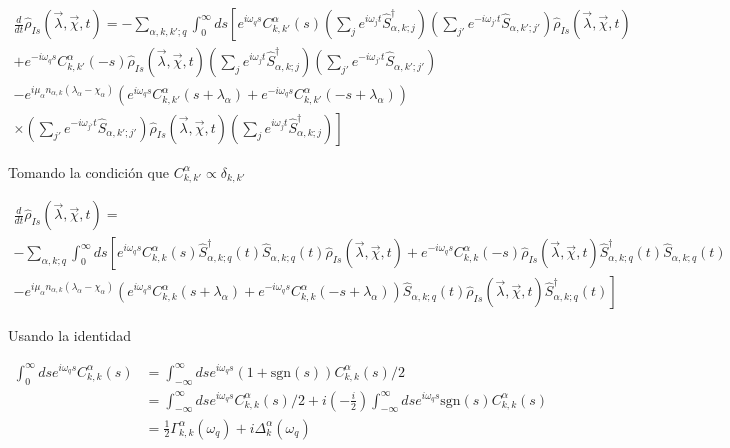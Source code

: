\begin{appendixs}
\begin{multline*}
    \frac{d}{dt}\hat{\rho}_{Is}(\vec{\lambda},\vec{\chi},t) = - \sum_{\alpha,k,k';q} \int_{0}^{\infty}ds \left[e^{i\omega_{q}s}C^{\alpha}_{k,k'}(s) \left(\sum_{j}e^{i\omega_{j}t}\hat{S}^{\dagger}_{\alpha,k;j} \right)\left(\sum_{j'}e^{-i\omega_{j'}t}\hat{S}_{\alpha,k';j'} \right)\hat{\rho}_{Is}(\vec{\lambda},\vec{\chi},t)  \right. \\
    \left. +  e^{-i\omega_{q}s}C^{\alpha}_{k,k'}(-s) \hat{\rho}_{Is}(\vec{\lambda},\vec{\chi},t) \left(\sum_{j}e^{i\omega_{j}t}\hat{S}^{\dagger}_{\alpha,k;j} \right)\left(\sum_{j'}e^{-i\omega_{j'}t}\hat{S}_{\alpha,k';j'} \right)\right. \\
    \left. - e^{i\mu_{\alpha}n_{\alpha,k}(\lambda_{\alpha}-\chi_{\alpha})}(e^{i\omega_{q}s}C^{\alpha}_{k,k'}(s+\lambda_{\alpha}) + e^{-i\omega_{q}s}C^{\alpha}_{k,k'}(-s+\lambda_{\alpha}) ) \right.\\
    \left.\times \left(\sum_{j'}e^{-i\omega_{j'}t}\hat{S}_{\alpha,k';j'} \right)\hat{\rho}_{Is}(\vec{\lambda},\vec{\chi},t) \left(\sum_{j}e^{i\omega_{j}t}\hat{S}^{\dagger}_{\alpha,k;j} \right)    \right]    
\end{multline*}

Tomando la condición que $C_{k,k'}^{\alpha} \propto \delta_{k,k'}$

\begin{multline*}
    \frac{d}{dt}\hat{\rho}_{Is}(\vec{\lambda},\vec{\chi},t) = \\
     - \sum_{\alpha,k;q} \int_{0}^{\infty}ds \left[e^{i\omega_{q}s}C^{\alpha}_{k,k}(s) \hat{S}^{\dagger}_{\alpha,k;q}(t)\hat{S}_{\alpha,k;q}(t)\hat{\rho}_{Is}(\vec{\lambda},\vec{\chi},t)  +  e^{-i\omega_{q}s}C^{\alpha}_{k,k}(-s) \hat{\rho}_{Is}(\vec{\lambda},\vec{\chi},t) \hat{S}^{\dagger}_{\alpha,k;q}(t) \hat{S}_{\alpha,k;q}(t) \right. \\
    \left. - e^{i\mu_{\alpha}n_{\alpha,k}(\lambda_{\alpha}-\chi_{\alpha})}(e^{i\omega_{q}s}C^{\alpha}_{k,k}(s+\lambda_{\alpha}) + e^{-i\omega_{q}s}C^{\alpha}_{k,k}(-s+\lambda_{\alpha}) ) \hat{S}_{\alpha,k;q}(t) \hat{\rho}_{Is}(\vec{\lambda},\vec{\chi},t) \hat{S}^{\dagger}_{\alpha,k;q}(t)    \right]    
\end{multline*}

Usando la identidad 

\begin{align*}
    \int_{0}^{\infty}ds e^{i\omega_{q}s}C^{\alpha}_{k,k}(s) & = \int_{-\infty}^{\infty}ds e^{i\omega_{q}s}(1+\text{sgn}(s))C^{\alpha}_{k,k}(s)/2 \\
    & = \int_{-\infty}^{\infty}ds e^{i\omega_{q}s}C^{\alpha}_{k,k}(s)/2 + i \left(-\frac{i}{2} \right) \int_{-\infty}^{\infty}ds e^{i\omega_{q}s} \text{sgn}(s)C^{\alpha}_{k,k}(s) \\
    & = \frac{1}{2}\Gamma_{k,k}^{\alpha}(\omega_{q}) + i \Delta^{\alpha}_{k}(\omega_{q})
\end{align*}


\end{appendixs}
